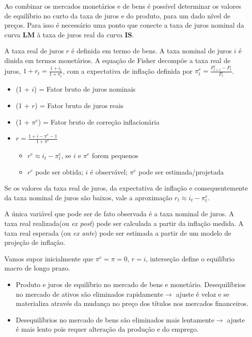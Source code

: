 \documentclass[a4paper,12pt]{article}[abntex2]
\begin{document}
Ao combinar os mercados monetários e de bens é possível determinar os valores de equilíbrio no curto da taxa de juros e do produto, para um dado nível de preços. Para isso é necessário uma ponto que conecte a taxa de juros nominal da curva \textbf{LM} à taxa de juros real da curva \textbf{IS}. 

A taxa real de juros $r$ é definida em termo de bens. A taxa nominal de juros $i$ é dinida em termos monetários. A equação de Fisher decompõe a taxa real de juros, $1+r_t=\frac{1+i_t}{1+\pi_t^e}$, com a expectativa de inflação definida por $\pi_t^e=\frac{P_{t+1}^e-P_t}{P_t}$.\begin{itemize}
    \item (1 + $i$) = Fator bruto de juros nominais 
    \item (1 + $r$) = Fator bruto de juros reais 
    \item (1 + $\pi^e$) = Fator bruto de correção inflacionária 
    \item $r=\frac{1+i-\pi^e-1}{1+\pi^e}$\begin{itemize}
        \item $r^e \approx i_t-\pi_t^e$, se $i$ e $\pi^e$ forem pequenos
        \item $r^e$ pode ser obtida; $i$ é observável; $\pi^e$ pode ser estimada/projetada
    \end{itemize}
\end{itemize}

Se os valores da taxa real de juros, da expectativa de inflação e consequentemente da taxa nominal de juros são baixos, vale a aproximação $r_t\approx i_t-\pi_t^e$.

A única variável que pode ser de fato observada é a taxa nominal de juros. A taxa real realizada(ou \textit{ex post}) pode ser calculada a partir da inflação medida. A taxa real esperada (ou \textit{ex ante}) pode ser estimada a partir de um modelo de projeção de inflação.

Vamos supor inicialmente que $\pi^e=\pi=0$, $r=i$, interseção define o equilíbrio macro de longo prazo. \begin{itemize}
    \item Produto e juros de equilíbrio no mercado de bens e monetário. Desequilíbrios no mercado de ativos são eliminados rapidamente$\rightarrow$ ajuste é veloz e se materializa através da mudança no preço dos títulos nos mercados financeiros.
    \item Desequilíbrios no mercado de bens são eliminados mais lentamente$\rightarrow$ ajuste é mais lento pois requer alteração da produção e do emprego.
\end{itemize}
\end{document}
